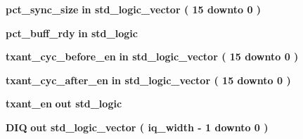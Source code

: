 \begin{DoxyCompactItemize}
\item 
{\bf pct\+\_\+sync\+\_\+size}  {\bfseries {\bfseries \textcolor{keywordflow}{in}\textcolor{vhdlchar}{ }}} {\bfseries \textcolor{comment}{std\+\_\+logic\+\_\+vector}\textcolor{vhdlchar}{ }\textcolor{vhdlchar}{(}\textcolor{vhdlchar}{ }\textcolor{vhdlchar}{ } \textcolor{vhdldigit}{15} \textcolor{vhdlchar}{ }\textcolor{keywordflow}{downto}\textcolor{vhdlchar}{ }\textcolor{vhdlchar}{ } \textcolor{vhdldigit}{0} \textcolor{vhdlchar}{ }\textcolor{vhdlchar}{)}\textcolor{vhdlchar}{ }} 
\item 
{\bf pct\+\_\+buff\+\_\+rdy}  {\bfseries {\bfseries \textcolor{keywordflow}{in}\textcolor{vhdlchar}{ }}} {\bfseries \textcolor{comment}{std\+\_\+logic}\textcolor{vhdlchar}{ }} 
\item 
{\bf txant\+\_\+cyc\+\_\+before\+\_\+en}  {\bfseries {\bfseries \textcolor{keywordflow}{in}\textcolor{vhdlchar}{ }}} {\bfseries \textcolor{comment}{std\+\_\+logic\+\_\+vector}\textcolor{vhdlchar}{ }\textcolor{vhdlchar}{(}\textcolor{vhdlchar}{ }\textcolor{vhdlchar}{ } \textcolor{vhdldigit}{15} \textcolor{vhdlchar}{ }\textcolor{keywordflow}{downto}\textcolor{vhdlchar}{ }\textcolor{vhdlchar}{ } \textcolor{vhdldigit}{0} \textcolor{vhdlchar}{ }\textcolor{vhdlchar}{)}\textcolor{vhdlchar}{ }} 
\item 
{\bf txant\+\_\+cyc\+\_\+after\+\_\+en}  {\bfseries {\bfseries \textcolor{keywordflow}{in}\textcolor{vhdlchar}{ }}} {\bfseries \textcolor{comment}{std\+\_\+logic\+\_\+vector}\textcolor{vhdlchar}{ }\textcolor{vhdlchar}{(}\textcolor{vhdlchar}{ }\textcolor{vhdlchar}{ } \textcolor{vhdldigit}{15} \textcolor{vhdlchar}{ }\textcolor{keywordflow}{downto}\textcolor{vhdlchar}{ }\textcolor{vhdlchar}{ } \textcolor{vhdldigit}{0} \textcolor{vhdlchar}{ }\textcolor{vhdlchar}{)}\textcolor{vhdlchar}{ }} 
\item 
{\bf txant\+\_\+en}  {\bfseries {\bfseries \textcolor{keywordflow}{out}\textcolor{vhdlchar}{ }}} {\bfseries \textcolor{comment}{std\+\_\+logic}\textcolor{vhdlchar}{ }} 
\item 
{\bf D\+IQ}  {\bfseries {\bfseries \textcolor{keywordflow}{out}\textcolor{vhdlchar}{ }}} {\bfseries \textcolor{comment}{std\+\_\+logic\+\_\+vector}\textcolor{vhdlchar}{ }\textcolor{vhdlchar}{(}\textcolor{vhdlchar}{ }\textcolor{vhdlchar}{ }\textcolor{vhdlchar}{ }\textcolor{vhdlchar}{ }{\bfseries {\bf iq\+\_\+width}} \textcolor{vhdlchar}{-\/}\textcolor{vhdlchar}{ } \textcolor{vhdldigit}{1} \textcolor{vhdlchar}{ }\textcolor{keywordflow}{downto}\textcolor{vhdlchar}{ }\textcolor{vhdlchar}{ } \textcolor{vhdldigit}{0} \textcolor{vhdlchar}{ }\textcolor{vhdlchar}{)}\textcolor{vhdlchar}{ }} 

\end{DoxyCompactItemize}
